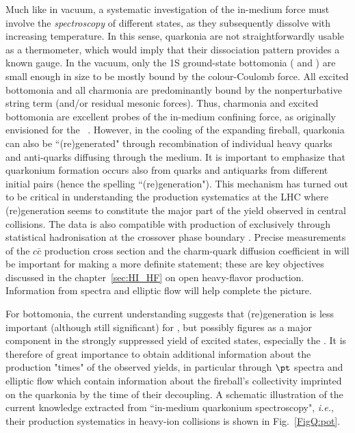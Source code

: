 \documentclass[../report.tex]{subfiles}
\begin{document}
Much like in vacuum, a systematic investigation of the in-medium force must involve the {\em spectroscopy} of different states, as they subsequently dissolve with increasing temperature. In this sense, quarkonia are not straightforwardly usable as a thermometer, which would imply that their dissociation pattern provides a known gauge. In the vacuum, only the 1S ground-state bottomonia ( and \PGhb) are small enough in size to be mostly bound by the colour-Coulomb force. All excited bottomonia and all charmonia are predominantly bound by the nonperturbative string term (and/or residual mesonic forces). 
Thus, charmonia and excited bottomonia are excellent probes of the in-medium confining force, as originally envisioned for the \PJgy~\cite{Matsui:1986dk}.
However, in the cooling of the expanding fireball, quarkonia can also be ``(re)generated" through recombination of individual heavy quarks and anti-quarks diffusing through the medium. It is important to emphasize that quarkonium formation occurs also from quarks and antiquarks from different initial pairs (hence the spelling ``(re)generation").
This mechanism \cite{BraunMunzinger:2000px,Thews:2000rj} has turned out to be critical in understanding the \PJgy production systematics at the LHC where (re)generation seems to constitute the major part of the yield observed in central \PbPb collisions.
The data is also compatible with production of \PJgy exclusively through statistical hadronisation at the crossover phase boundary \cite{Andronic:2017pug}.
Precise measurements of the $c\bar{c}$ production cross section and the charm-quark diffusion coefficient in \RunsThreeFour will be important for making a more definite statement; these are key objectives discussed in the chapter~\ref{sec:HI_HF} on open heavy-flavor production. Information from \pt spectra and elliptic flow will help complete the picture.

For bottomonia, the current understanding suggests that (re)generation is less important (although still significant) for , but possibly figures as a major component in the strongly suppressed yield of excited states, especially the . It is therefore of great importance to obtain additional information about the production "times" of the observed yields, in particular through $\pt$ spectra and elliptic flow which contain information about the fireball's collectivity imprinted on the quarkonia by the time of their decoupling. A schematic illustration of the current knowledge extracted from ``in-medium quarkonium spectroscopy", {\it i.e.}, their production systematics in heavy-ion collisions is shown in Fig.~\ref{FigQ:pot}.        
\end{document}
